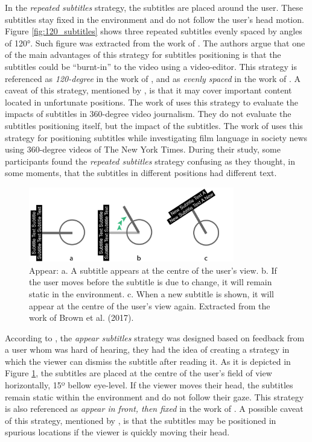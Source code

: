 In the \emph{repeated subtitles} strategy, the subtitles are placed around the user. These subtitles stay fixed in the environment and do not follow the user's head motion. Figure \ref{fig:120_subtitles} shows three repeated subtitles evenly spaced by angles of 120°. Such figure was extracted from the work of \cite{brown_subtitles_2017}. The authors argue that one of the main advantages of this strategy for subtitles positioning is that the subtitles could be ``burnt-in'' to the video using a video-editor. This strategy is referenced as \emph{120-degree} in the work of \cite{brown_subtitles_2017}, and as \emph{evenly spaced} in the work of \cite{montagud_culture_2020}. A caveat of this strategy, mentioned by \cite{brown_subtitles_2017}, is that it may cover important content located in unfortunate positions. 
The work of \cite{li_impacts_2018} uses this strategy to evaluate the impacts of subtitles in 360-degree video journalism. They do not evaluate the subtitles positioning itself, but the impact of the subtitles. The work of \cite{chen_film_2017} uses this strategy for positioning subtitles while investigating film language in society news using 360-degree videos of The New York Times. During their study, some participants found the \emph{repeated subtitles} strategy confusing as they thought, in some moments, that the subtitles in different positions had different text.


\begin{figure}[!ht]
    \centering
    \includegraphics[width=0.8\textwidth]{img/video360/appear.png}
    \caption{Appear: a. A subtitle appears at the centre of the user's view. b. If the user moves before the subtitle is due to change, it will remain static in the environment. c. When a new subtitle is shown, it will appear at the centre of the user's view again. Extracted from the work of Brown et al. (2017).}
    \label{fig:appear_subtitle}
\end{figure}

According to \cite{brown_subtitles_2017}, the \emph{appear subtitles} strategy was designed based on feedback from a user whom was hard of hearing, they had the idea of creating a strategy in which the viewer can dismiss the subtitle after reading it. As it is depicted in Figure \ref{fig:appear_subtitle}, the subtitles are placed at the centre of the user's field of view horizontally, 15º bellow eye-level. If the viewer moves their head, the subtitles remain static within the environment and do not follow their gaze. This strategy is also referenced as \emph{appear in front, then fixed} in the work of \cite{montagud_culture_2020}. A possible caveat of this strategy, mentioned by \cite{brown_subtitles_2017}, is that the subtitles may be positioned in spurious locations if the viewer is quickly moving their head.

